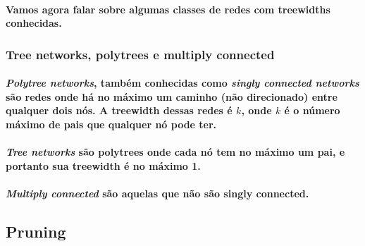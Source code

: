 \documentclass[a4paper,10pt]{article}
\theoremstyle{plain}
\begin{document}
\paragraph{
  Vamos agora falar sobre algumas classes de redes com treewidths conhecidas.
}

\subsubsection{Tree networks, polytrees e multiply connected}

\paragraph{
  \textit{Polytree networks}, também conhecidas como \textit{singly connected networks} são redes
  onde há no máximo um caminho (não direcionado) entre qualquer dois nós. A treewidth dessas redes
  é $k$, onde $k$ é o número máximo de pais que qualquer nó pode ter.
}

\paragraph{
  \textit{Tree networks} são polytrees onde cada nó tem no máximo um pai, e portanto sua treewidth
  é no máximo 1.
}

\paragraph{
  \textit{Multiply connected} são aquelas que não são singly connected.
}

\subsection{Pruning}



\newpage

\printbibliography
\end{document}
